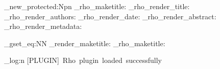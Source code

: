 \cs_new_protected:Npn \zigma_rho_maketitle:
  {
    \if@twocolumn
      \thispagestyle{firststyle}
    \else
      \zigma_rho_render_title:
      \zigma_rho_render_authors:
      \zigma_rho_render_date:
      \zigma_rho_render_abstract:
      \zigma_rho_render_metadata:
    \fi
  }

\cs_gset_eq:NN \zigma_render_maketitle: \zigma_rho_maketitle:

\zigma_log:n { [PLUGIN]~Rho~plugin~loaded~successfully }

\ExplSyntaxOff

\endinput
